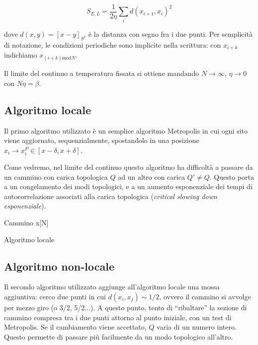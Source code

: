 \documentclass[a4paper,11pt]{article}
\begin{document}
    \begin{equation}
        S_{E,L} = \frac{1}{2\eta} \sum_i d(x_{i+1}, x_{i})^2
    \end{equation}
    
    dove $d(x,y) = [x - y]_{S^1}$ è la distanza con segno fra i due punti. Per semplicità di notazione, le condizioni periodiche sono implicite nella scrittura: con $x_{i+k}$ indichiamo $x_{(i + k) \mathrm{mod} N}$.
    
    Il limite del continuo a temperatura fissata si ottiene mandando $N \to \infty$, $\eta \to 0$ con $N\eta = \beta$.
    
    
    \subsection{Algoritmo locale}
    
    Il primo algoritmo utilizzato è un semplice algoritmo Metropolis in cui ogni sito viene aggiornato, sequenzialmente, spostandolo in una posizione $x_i \to x^P_i \in [x - \delta, x + \delta]$.
    
    Come vedremo, nel limite del continuo questo algoritmo ha difficoltà a passare da un cammino con carica topologica $Q$ ad un altro con carica $Q' \neq Q$. Questo porta a un congelamento dei modi topologici, e a un aumento esponenziale dei tempi di autocorrelazione associati alla carica topologica (\emph{critical slowing down esponenziale}).
    
    \begin{algorithm}[H]
    Cammino x[N]\;
    \caption{Algoritmo locale}
    \label{alg:local}
    \end{algorithm}
    
    \subsection{Algoritmo non-locale}
    
    Il secondo algoritmo utilizzato aggiunge all'algoritmo locale una mossa aggiuntiva: cerco due punti in cui $d(x_i, x_j) \sim 1/2$, ovvero il cammino si avvolge per mezzo giro (o 3/2, 5/2...). A questo punto, tento di ``ribaltare'' la sezione di cammino compresa tra i due punti attorno al punto iniziale, con un test di Metropolis. Se il cambiamento viene accettato, $Q$ varia di un numero intero. Questo permette di passare più facilmente da un modo topologico all'altro.
\end{document}
